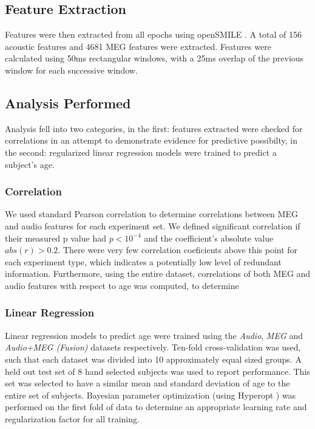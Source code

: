 \documentclass[a4paper]{article}
\begin{document}
\subsection{Feature Extraction}

Features were then extracted from all epochs using openSMILE \cite{Eyben13-RDI}. A total of 156 acoustic features and 4681 MEG features were extracted. Features were calculated using 50ms rectangular windows, with a 25ms overlap of the previous window for each successive window.

\subsection{Analysis Performed}

Analysis fell into two categories, in the first: features extracted were checked for correlations in an attempt to demonstrate evidence for predictive possibilty, in the second: regularized linear regression models were trained to predict a subject's age.

\subsubsection{Correlation}

We used standard Pearson correlation to determine correlations between MEG and audio features for each experiment set. We defined significant correlation if their measured p value had $p < 10^{-4}$ and the coefficient's absolute value $abs(r) > 0.2$. There were very few correlation coeficients above this point for each experiment type, which indicates a potentially low level of redundant information. Furthermore, using the entire dataset, correlations of both MEG and audio features with respect to age was computed, to determine

\subsubsection{Linear Regression}

Linear regression models to predict age were trained using the \textit{Audio}, \textit{MEG} and \textit{Audio+MEG (Fusion)} datasets respectively. Ten-fold cross-validation was used, such that each dataset was divided into 10 approximately equal sized groups. A held out test set of 8 hand selected subjects was used to report performance. This set was selected to have a similar mean and standard deviation of age to the entire set of subjects. Bayesian parameter optimization (using Hyperopt \cite{Bergstra2013}) was performed on the first fold of data to determine an appropriate learning rate and regularization factor for all training.
\end{document}
